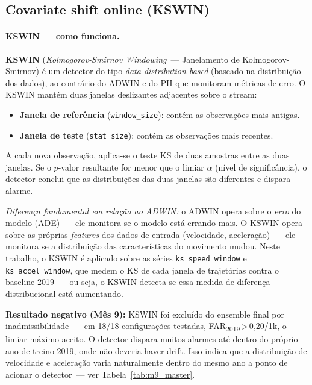 \documentclass[11pt,a4paper]{article}
\begin{document}
\subsection{Covariate shift online (KSWIN)}

\paragraph{KSWIN --- como funciona.}
\textbf{KSWIN} (\emph{Kolmogorov-Smirnov Windowing}~--- Janelamento de Kolmogorov-Smirnov) \cite{kswin} \'e um detector do tipo \emph{data-distribution based} (baseado na distribui\c{c}\~ao dos dados), ao contr\'ario do ADWIN e do PH que monitoram m\'etricas de erro. O KSWIN mant\'em duas janelas deslizantes adjacentes sobre o stream:
\begin{itemize}[leftmargin=1.4em,itemsep=1pt]
    \item \textbf{Janela de refer\^encia} (\texttt{window\_size}): cont\'em as observa\c{c}\~oes mais antigas.
    \item \textbf{Janela de teste} (\texttt{stat\_size}): cont\'em as observa\c{c}\~oes mais recentes.
\end{itemize}
A cada nova observa\c{c}\~ao, aplica-se o teste KS de duas amostras entre as duas janelas. Se o $p$-valor resultante for menor que o limiar $\alpha$ (n\'ivel de signific\^ancia), o detector conclui que as distribui\c{c}\~oes das duas janelas s\~ao diferentes e dispara alarme.

\emph{Diferen\c{c}a fundamental em rela\c{c}\~ao ao ADWIN:} o ADWIN opera sobre o \emph{erro} do modelo (ADE)~--- ele monitora se o modelo est\'a errando mais. O KSWIN opera sobre as pr\'oprias \emph{features} dos dados de entrada (velocidade, acelera\c{c}\~ao)~--- ele monitora se a distribui\c{c}\~ao das caracter\'isticas do movimento mudou. Neste trabalho, o KSWIN \'e aplicado sobre as s\'eries \texttt{ks\_speed\_window} e \texttt{ks\_accel\_window}, que medem o KS de cada janela de trajet\'orias contra o baseline 2019~--- ou seja, o KSWIN detecta se essa medida de diferen\c{c}a distribucional est\'a aumentando.

\textbf{Resultado negativo (M\^es 9):} KSWIN foi exclu\'ido do ensemble final por inadmissibilidade~--- em 18/18 configura\c{c}\~oes testadas, FAR\textsubscript{2019}\,>\,0{,}20/1k, o limiar m\'aximo aceito. O detector dispara muitos alarmes at\'e dentro do pr\'oprio ano de treino 2019, onde n\~ao deveria haver drift. Isso indica que a distribui\c{c}\~ao de velocidade e acelera\c{c}\~ao varia naturalmente dentro do mesmo ano a ponto de acionar o detector~--- ver Tabela~\ref{tab:m9_master}.
\end{document}

